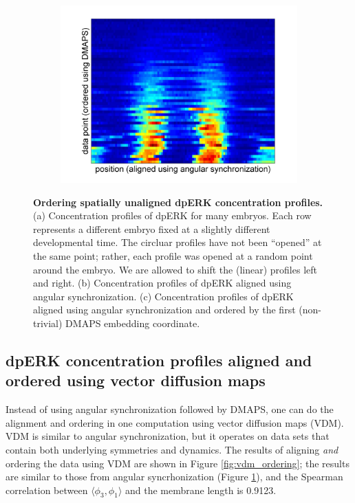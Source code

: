 \documentclass[10pt]{article}
\begin{document}
\begin{figure}[!ht]
\begin{subfigure}{0.3\textwidth}
\includegraphics[width=\textwidth]{data_ordered_angsynch}
\caption{}
\end{subfigure}
\caption{{\bf Ordering spatially unaligned dpERK concentration profiles.} (a) Concentration profiles of dpERK for many embryos. Each row represents a different embryo fixed at a slightly different developmental time. The circluar profiles have not been ``opened'' at the same point; rather, each profile was opened at a random point around the embryo. We are allowed to shift the (linear) profiles left and right.
(b) Concentration profiles of dpERK aligned using angular synchronization.
(c) Concentration profiles of dpERK aligned using angular synchronization and ordered by the first (non-trivial) DMAPS embedding coordinate.}
\label{fig:angsynch_ordering}
\end{figure}

\subsection*{dpERK concentration profiles aligned and ordered using vector diffusion maps}

Instead of using angular synchronization followed by DMAPS, one can do the alignment and ordering in one computation using vector diffusion maps (VDM).
%
VDM is similar to angular synchronization, but it operates on data sets that contain both underlying symmetries and dynamics.
%
The results of aligning {\em and} ordering the data using VDM are shown in Figure \ref{fig:vdm_ordering}; the results are similar to those from angular syncrhonization (Figure \ref{fig:angsynch_ordering}), and the Spearman correlation between $\langle \phi_3, \phi_1 \rangle$ and the membrane length is 0.9123.
\end{document}
